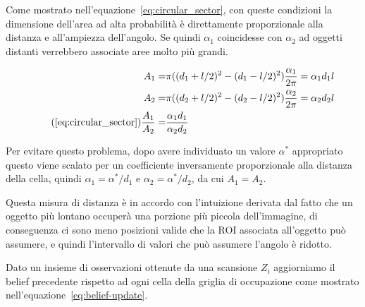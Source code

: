 \documentclass[a4paper]{article}
\begin{document}
	\newpage
	Come mostrato nell'equazione~\ref{eq:circular_sector}, con queste
	condizioni la dimensione dell'area ad alta probabilità è direttamente
	proporzionale alla distanza e all'ampiezza dell'angolo. Se quindi $
	\alpha_1 $ coincidesse con $ \alpha _2 $ ad oggetti distanti verrebbero
	associate aree molto più grandi. 

	\begin{subequations}\label{eq:circular_sector}
	\begin{align*} 
		A_1  = & \pi((d_1+l/2)^2-(d_1-l/2)^2)\frac{\alpha_1}{2\pi}  =  \alpha_1 d_1l \\
		A_2  = & \pi((d_2+l/2)^2-(d_2-l/2)^2)\frac{\alpha_2}{2\pi}  =  \alpha_2 d_2l \\
\tag{\ref{eq:circular_sector}}
		\frac{A_1}{A_2} = & \frac	{\alpha_1 d_1} {\alpha_2 d_2}
	\end{align*}
	\end{subequations}
	
		
	Per evitare questo problema, dopo avere
	individuato un valore $ \alpha ^* $ appropriato questo viene scalato per un
	coefficiente inversamente proporzionale alla distanza della cella, quindi $
	\alpha _1 = \alpha ^*/d_1 $ e $ \alpha _2=\alpha ^*/d_2 $, da cui $A_1=A_2$. 
	
	Questa misura di distanza è in accordo con l'intuizione derivata dal fatto
	che un oggetto più lontano occuperà una porzione più piccola dell'immagine,
	di conseguenza ci sono meno posizioni valide che la ROI associata
	all'oggetto può assumere, e quindi l'intervallo di valori che può assumere
	l'angolo è ridotto.

	
	Dato un insieme di osservazioni ottenute da una scansione $ Z_i $ aggiorniamo il belief precedente rispetto ad ogni cella della griglia di occupazione come mostrato nell'equazione~\ref{eq:belief-update}.
\end{document}
